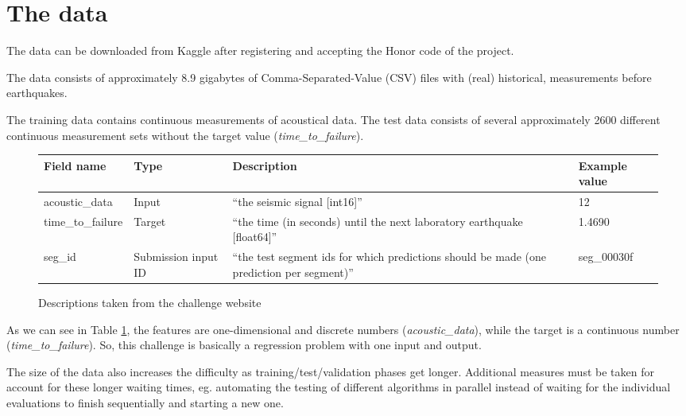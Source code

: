 \documentclass[colorback,accentcolor=tud9c,12pt]{tudreport}
\begin{document}
\section{The data}
The data can be downloaded from Kaggle after registering and accepting the Honor code of the project.

The data consists of approximately 8.9 gigabytes of Comma-Separated-Value (CSV) files with (real) historical, measurements before earthquakes.

The training data contains continuous measurements of acoustical data.
The test data consists of several approximately 2600 different continuous measurement sets without the target value (\textit{time\_to\_failure}).


\begin{figure}[htp]
	\begin{tabularx}{\textwidth}{ L{8}|L{5}|L{12}|L{7} }
		Field name        & Type                & Description                                                                                & Example value \\
		\hline
		acoustic\_data    & Input               & ``the seismic signal [int16]''                                                             & 12            \\
		\hline
		time\_to\_failure & Target              & ``the time (in seconds) until the next laboratory earthquake [float64]''                   & 1.4690        \\
		\hline
		seg\_id           & Submission input ID & ``the test segment ids for which predictions should be made (one prediction per segment)'' & seg\_00030f   \\
	\end{tabularx}
	\caption{Descriptions taken from the challenge website}
	\label{table:data}
\end{figure}


As we can see in Table \ref{table:data}, the features are one-dimensional and discrete numbers (\textit{acoustic\_data}), while the target is a continuous number (\textit{time\_to\_failure}).
So, this challenge is basically a regression problem with one input and output.

The size of the data also increases the difficulty as training/test/validation phases get longer. Additional measures must be taken for account for these longer waiting times, eg. automating the testing of different algorithms in parallel instead of waiting for the individual evaluations to finish sequentially and starting a new one.
\end{document}
